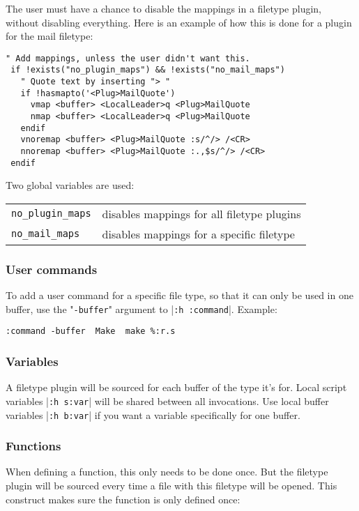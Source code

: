 The user must have a chance to disable the mappings in a filetype plugin, without disabling everything.
Here is an example of how this is done for a plugin for the mail filetype:

\begin{Verbatim}[samepage=true]
 " Add mappings, unless the user didn't want this.
 if !exists("no_plugin_maps") && !exists("no_mail_maps")
   " Quote text by inserting "> "
   if !hasmapto('<Plug>MailQuote')
     vmap <buffer> <LocalLeader>q <Plug>MailQuote
     nmap <buffer> <LocalLeader>q <Plug>MailQuote
   endif
   vnoremap <buffer> <Plug>MailQuote :s/^/> /<CR>
   nnoremap <buffer> <Plug>MailQuote :.,$s/^/> /<CR>
 endif
\end{Verbatim}

Two global variables are used:
\begin{center} \begin{tabular}{l l}
				\verb!no_plugin_maps! & disables mappings for all filetype plugins \\
				\verb!no_mail_maps! & disables mappings for a specific filetype \\
\end{tabular} \end{center}

\subsubsection{User commands}
To add a user command for a specific file type, so that it can only be used in one buffer, use the "\verb!-buffer!" argument to |\verb!:h :command!|.
Example:

\begin{Verbatim}[samepage=true]
 :command -buffer  Make  make %:r.s
\end{Verbatim}

\subsubsection{Variables}
A filetype plugin will be sourced for each buffer of the type it's for.
Local script variables |\verb!:h s:var!| will be shared between all invocations.
Use local buffer variables |\verb!:h b:var!| if you want a variable specifically for one buffer.

\subsubsection{Functions}
When defining a function, this only needs to be done once.
But the filetype plugin will be sourced every time a file with this filetype will be opened.
This construct makes sure the function is only defined once:

